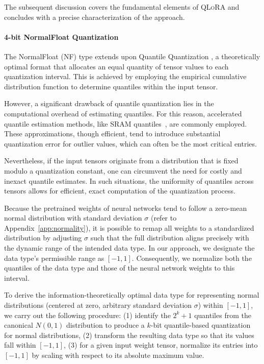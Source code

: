 The subsequent discussion covers the fundamental elements of \textsc{QLoRA} and concludes with a precise characterization of the approach.

\paragraph{4-bit NormalFloat Quantization} The NormalFloat (NF) type extends upon Quantile Quantization \citep{dettmers2022optimizers}, a theoretically optimal format that allocates an equal quantity of tensor values to each quantization interval. This is achieved by employing the empirical cumulative distribution function to determine quantiles within the input tensor.

However, a significant drawback of quantile quantization lies in the computational overhead of estimating quantiles. For this reason, accelerated quantile estimation methods, like SRAM quantiles~\citep{dettmers2022optimizers}, are commonly employed. These approximations, though efficient, tend to introduce substantial quantization error for outlier values, which can often be the most critical entries.

Nevertheless, if the input tensors originate from a distribution that is fixed modulo a quantization constant, one can circumvent the need for costly and inexact quantile estimates. In such situations, the uniformity of quantiles across tensors allows for efficient, exact computation of the quantization process.

Because the pretrained weights of neural networks tend to follow a zero-mean normal distribution with standard deviation $\sigma$ (refer to Appendix~\ref{app:normality}), it is possible to remap all weights to a standardized distribution by adjusting $\sigma$ such that the full distribution aligns precisely with the dynamic range of the intended data type. In our approach, we designate the data type’s permissible range as $[-1, 1]$. Consequently, we normalize both the quantiles of the data type and those of the neural network weights to this interval.

To derive the information-theoretically optimal data type for representing normal distributions (centered at zero, arbitrary standard deviation $\sigma$) within $[-1, 1]$, we carry out the following procedure: (1) identify the $2^k+1$ quantiles from the canonical $N(0, 1)$ distribution to produce a $k$-bit quantile-based quantization for normal distributions, (2) transform the resulting data type so that its values fall within $[-1, 1]$, (3) for a given input weight tensor, normalize its entries into $[-1, 1]$ by scaling with respect to its absolute maximum value.

